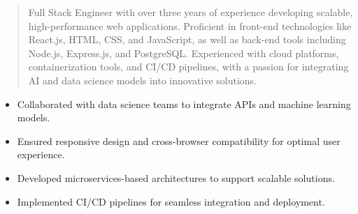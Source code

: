 



\makecvheader

\begin{quote}
  \noindent
  Full Stack Engineer with over three years of experience developing scalable, high-performance web applications. Proficient in front-end technologies like React.js, HTML, CSS, and JavaScript, as well as back-end tools including Node.js, Express.js, and PostgreSQL. Experienced with cloud platforms, containerization tools, and CI/CD pipelines, with a passion for integrating AI and data science models into innovative solutions.
\end{quote}

\par\smallskip
\noindent
\begin{minipage}{20cm}
  \begin{minipage}{9.75cm}
    \begin{itemize}
      \item Collaborated with data science teams to integrate APIs and machine learning models.
      \item Ensured responsive design and cross-browser compatibility for optimal user experience.
    \end{itemize}
  \end{minipage}
  \hfill
  \begin{minipage}{9.75cm}
    \begin{itemize}
      \item Developed microservices-based architectures to support scalable solutions.
      \item Implemented CI/CD pipelines for seamless integration and deployment.
    \end{itemize}
  \end{minipage}
\end{minipage}
\par\smallskip
\divider

